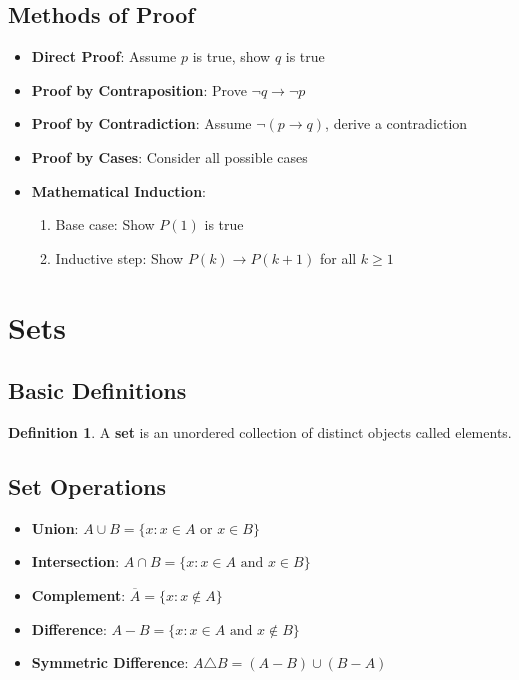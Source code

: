 \documentclass[11pt]{article}
\theoremstyle{definition}
\newtheorem{definition}{Definition}[section]
\begin{document}
\subsection{Methods of Proof}
\begin{itemize}
    \item \textbf{Direct Proof}: Assume $p$ is true, show $q$ is true
    \item \textbf{Proof by Contraposition}: Prove $\neg q \rightarrow \neg p$
    \item \textbf{Proof by Contradiction}: Assume $\neg(p \rightarrow q)$, derive a contradiction
    \item \textbf{Proof by Cases}: Consider all possible cases
    \item \textbf{Mathematical Induction}: 
        \begin{enumerate}
            \item Base case: Show $P(1)$ is true
            \item Inductive step: Show $P(k) \rightarrow P(k+1)$ for all $k \geq 1$
        \end{enumerate}
\end{itemize}

\section{Sets}

\subsection{Basic Definitions}
\begin{definition}
A \textbf{set} is an unordered collection of distinct objects called elements.
\end{definition}

\subsection{Set Operations}
\begin{itemize}
    \item \textbf{Union}: $A \cup B = \{x : x \in A \text{ or } x \in B\}$
    \item \textbf{Intersection}: $A \cap B = \{x : x \in A \text{ and } x \in B\}$
    \item \textbf{Complement}: $\overline{A} = \{x : x \notin A\}$
    \item \textbf{Difference}: $A - B = \{x : x \in A \text{ and } x \notin B\}$
    \item \textbf{Symmetric Difference}: $A \triangle B = (A - B) \cup (B - A)$
\end{itemize}
\end{document}
